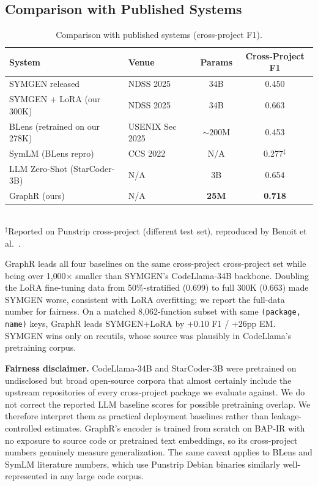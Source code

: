 \documentclass[sigconf,nonacm]{acmart}
\newcommand{\sysname}{\textsf{GraphR}}
\begin{document}
\subsection{Comparison with Published Systems}

\begin{table}[t]
    \centering
    \caption{Comparison with published systems (cross-project F1).}
    \label{tab:comparison}
    \footnotesize
    \begin{tabular}{llcc}
        \toprule
        \textbf{System} & \textbf{Venue} & \textbf{Params} & \textbf{Cross-Project F1} \\
        \midrule
        SYMGEN released~\cite{symgen} & NDSS 2025 & 34B & 0.450 \\
        SYMGEN + LoRA (our 300K) & NDSS 2025 & 34B & 0.663 \\
        BLens (retrained on our 278K)~\cite{blens} & USENIX Sec 2025 & ${\sim}200$M & 0.453 \\
        SymLM (BLens repro)~\cite{symlm,blens} & CCS 2022 & N/A & 0.277$^\ddagger$ \\
        LLM Zero-Shot (StarCoder-3B) & N/A & 3B & 0.654 \\
        \sysname{} (ours) & N/A & \textbf{25M} & \textbf{0.718} \\
        \bottomrule
    \end{tabular}
    \\[0.3em]
    \footnotesize$^\ddagger$Reported on Punstrip cross-project (different test set), reproduced by Benoit et al.~\cite{blens}.
\end{table}

\sysname{} leads all four baselines on the same cross-project cross-project set while being over 1{,}000$\times$ smaller than SYMGEN's CodeLlama-34B backbone. Doubling the LoRA fine-tuning data from 50\%-stratified (0.699) to full 300K (0.663) made SYMGEN worse, consistent with LoRA overfitting; we report the full-data number for fairness. On a matched 8{,}062-function subset with same \texttt{(package, name)} keys, \sysname{} leads SYMGEN+LoRA by $+0.10$ F1 / $+26$pp EM. SYMGEN wins only on recutils, whose source was plausibly in CodeLlama's pretraining corpus.

\textbf{Fairness disclaimer.} CodeLlama-34B and StarCoder-3B were pretrained on undisclosed but broad open-source corpora that almost certainly include the upstream repositories of every cross-project package we evaluate against. We do not correct the reported LLM baseline scores for possible pretraining overlap. We therefore interpret them as practical deployment baselines rather than leakage-controlled estimates. \sysname{}'s encoder is trained from scratch on BAP-IR with no exposure to source code or pretrained text embeddings, so its cross-project numbers genuinely measure generalization. The same caveat applies to BLens and SymLM literature numbers, which use Punstrip Debian binaries similarly well-represented in any large code corpus.
\end{document}
